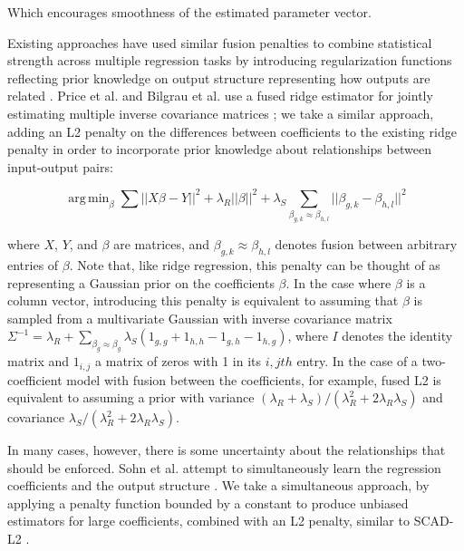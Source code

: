 \documentclass[11pt]{article}
\DeclareMathOperator*{\argmin}{arg\,min}
\begin{document}
Which encourages smoothness of the estimated parameter vector. 

Existing approaches have used similar fusion penalties to combine statistical strength across multiple regression tasks by introducing regularization functions reflecting prior knowledge on output structure representing how outputs are related \cite{kim_tree-guided_2012,Land1997,Chen2010,Petry2011,Hebiri2011}. Price et al. and Bilgrau et al. use a fused ridge estimator for jointly estimating multiple inverse covariance matrices \cite{Price2014a,Bilgrau2015}; we take a similar approach, adding an L2 penalty on the differences between coefficients to the existing ridge penalty in order to incorporate prior knowledge about relationships between input-output pairs:


\begin{equation}
\argmin_{\beta} \displaystyle\sum \vert \vert X\beta - Y \vert \vert ^2 + \lambda_R \vert \vert \beta \vert \vert ^2 +  \lambda_S  \displaystyle \sum_{\beta_{g,k} \approx \beta_{h,l}} || \beta_{g,k} - \beta_{h,l} ||^2
\label{eqn:main}
\end{equation}

where $X$, $Y$, and $\beta$ are matrices, and $\beta_{g,k} \approx \beta_{h,l}$ denotes fusion between arbitrary entries of $\beta$. Note that, like ridge regression, this penalty can be thought of as representing a Gaussian prior on the coefficients $\beta$. In the case where $\beta$ is a column vector, introducing this penalty is equivalent to assuming that $\beta$ is sampled from a multivariate Gaussian with inverse covariance matrix $\Sigma^{-1} = \lambda_R + \displaystyle \sum_{\beta_g \approx \beta_g} \lambda_S (1_{g,g} + 1_{h,h} - 1_{g,h} - 1_{h,g})$, where $I$ denotes the identity matrix and $1_{i,j}$ a matrix of zeros with 1 in its $i, jth$ entry. In the case of a two-coefficient model with fusion between the coefficients, for example, fused L2 is equivalent to assuming a prior with variance $(\lambda_R + \lambda_S)/(\lambda_R^2+2\lambda_R\lambda_S)$ and covariance $\lambda_S/(\lambda_R^2+2\lambda_R\lambda_S)$.


In many cases, however, there is some uncertainty about the relationships that should be enforced. Sohn et al. attempt to simultaneously learn the regression coefficients and the output structure \cite{sohn_joint_2012}. We take a simultaneous approach, by applying a penalty function bounded by a constant to produce unbiased estimators for large coefficients, combined with an L2 penalty, similar to SCAD-L2 \cite{Zeng2012}. 
\end{document}
